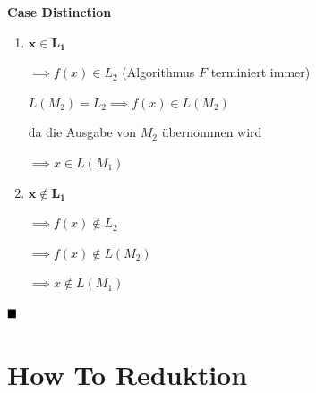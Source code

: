 \documentclass[a4paper, 11pt]{article}
\begin{document}
                            \textbf{Case Distinction}
                            \begin{enumerate}[label=\Roman*.]
                                \item $\mathbf{x \in L_1}$
                                
                                $\implies f(x) \in L_2$  (Algorithmus $F$ terminiert immer)
                        
                                $L(M_2) = L_2 \implies f(x) \in L(M_2)$ 
                                
                                da die Ausgabe von $M_2$ übernommen wird
                                
                                $\implies x \in L(M_1)$
                                \item $\mathbf{x \notin L_1}$
                                
                                $\implies f(x) \notin L_2$
                        
                                $\implies f(x) \notin L(M_2)$
                        
                                $\implies x \notin L(M_1)$
                            \end{enumerate}
                            $\hfill\blacksquare$
                        
                
                
                \section{How To Reduktion}
                
\end{document}
